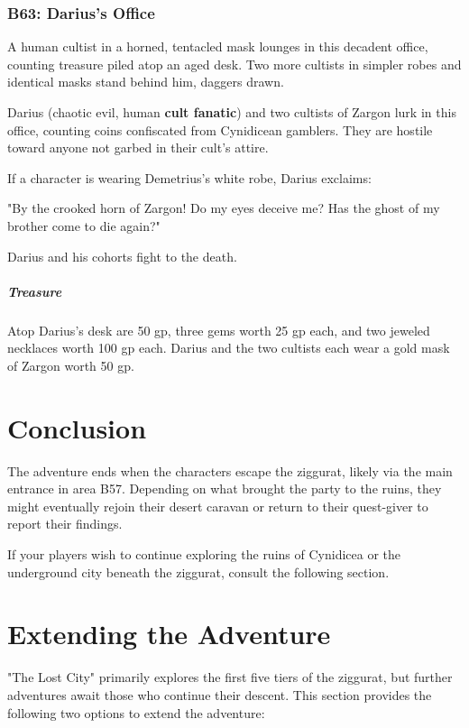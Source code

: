 \documentclass[10pt,a4paper,twoside,bg=print,twocolumn,openany,nodeprecatedcode]{dndbook}
\begin{document}
\subsubsection{B63: Darius's Office}
\begin{DndReadAloud}{}
A human cultist in a horned, tentacled mask lounges in this decadent office, counting treasure piled atop an aged desk. Two more cultists in simpler robes and identical masks stand behind him, daggers drawn.

\end{DndReadAloud}

Darius (chaotic evil, human \textbf{cult fanatic}) and two cultists of Zargon lurk in this office, counting coins confiscated from Cynidicean gamblers. They are hostile toward anyone not garbed in their cult's attire.

If a character is wearing Demetrius's white robe, Darius exclaims:

\begin{DndReadAloud}{}
"By the crooked horn of Zargon! Do my eyes deceive me? Has the ghost of my brother come to die again?"

\end{DndReadAloud}

Darius and his cohorts fight to the death.

\subparagraph{Treasure}
Atop Darius's desk are 50 gp, three gems worth 25 gp each, and two jeweled necklaces worth 100 gp each. Darius and the two cultists each wear a gold mask of Zargon worth 50 gp.

\section{Conclusion}
The adventure ends when the characters escape the ziggurat, likely via the main entrance in area B57. Depending on what brought the party to the ruins, they might eventually rejoin their desert caravan or return to their quest-giver to report their findings.

If your players wish to continue exploring the ruins of Cynidicea or the underground city beneath the ziggurat, consult the following section.

\section{Extending the Adventure}
"The Lost City" primarily explores the first five tiers of the ziggurat, but further adventures await those who continue their descent. This section provides the following two options to extend the adventure:
\end{document}
